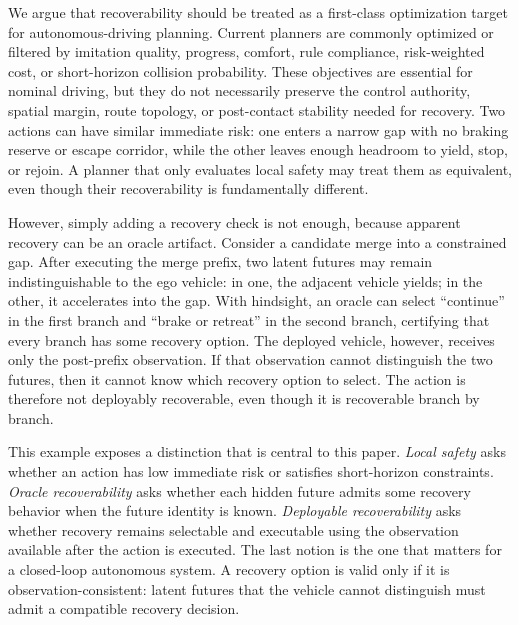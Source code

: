 \documentclass[conference]{IEEEtran}
\begin{document}
We argue that recoverability should be treated as a first-class optimization target for autonomous-driving planning.  Current planners are commonly optimized or filtered by imitation quality, progress, comfort, rule compliance, risk-weighted cost, or short-horizon collision probability.  These objectives are essential for nominal driving, but they do not necessarily preserve the control authority, spatial margin, route topology, or post-contact stability needed for recovery.  Two actions can have similar immediate risk: one enters a narrow gap with no braking reserve or escape corridor, while the other leaves enough headroom to yield, stop, or rejoin.  A planner that only evaluates local safety may treat them as equivalent, even though their recoverability is fundamentally different.

However, simply adding a recovery check is not enough, because apparent recovery can be an oracle artifact.  Consider a candidate merge into a constrained gap.  After executing the merge prefix, two latent futures may remain indistinguishable to the ego vehicle: in one, the adjacent vehicle yields; in the other, it accelerates into the gap.  With hindsight, an oracle can select ``continue'' in the first branch and ``brake or retreat'' in the second branch, certifying that every branch has some recovery option.  The deployed vehicle, however, receives only the post-prefix observation.  If that observation cannot distinguish the two futures, then it cannot know which recovery option to select.  The action is therefore not deployably recoverable, even though it is recoverable branch by branch.

This example exposes a distinction that is central to this paper.  \emph{Local safety} asks whether an action has low immediate risk or satisfies short-horizon constraints.  \emph{Oracle recoverability} asks whether each hidden future admits some recovery behavior when the future identity is known.  \emph{Deployable recoverability} asks whether recovery remains selectable and executable using the observation available after the action is executed.  The last notion is the one that matters for a closed-loop autonomous system.  A recovery option is valid only if it is observation-consistent: latent futures that the vehicle cannot distinguish must admit a compatible recovery decision.
\end{document}
